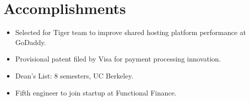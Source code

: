 \documentclass[11pt,letterpaper]{article}
\begin{document}
\section*{Accomplishments}
\begin{itemize}
  \item Selected for Tiger team to improve shared hosting platform performance at GoDaddy.
  \item Provisional patent filed by Visa for payment processing innovation.
  \item Dean\textquoteright{}s List: 8 semesters, UC Berkeley.
  \item Fifth engineer to join startup at Functional Finance.
\end{itemize}
\end{document}
